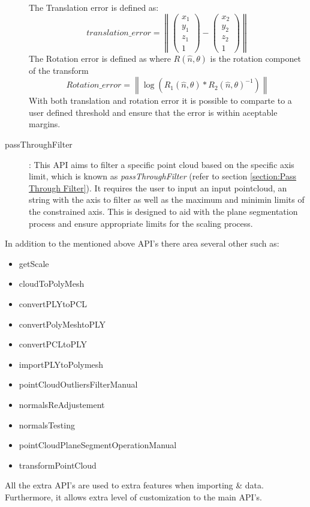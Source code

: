 \documentclass[12pt]{report}
\begin{document}
\begin{description}
   The Translation error is defined as:
   \begin{equation}
     translation\_error = \left\lVert \begin{pmatrix} x_1 \\y_1\\z_1\\1  \end{pmatrix} - \begin{pmatrix} x_2 \\y_2\\z_2\\1  \end{pmatrix} \right\rVert    
    \label{equ:translation error}
    \end{equation}
   The Rotation error is defined as where $R(\hat{n},\theta)$ is the rotation componet of the transform 
   \begin{equation}
     Rotation\_error =\left\lVert \log (R_1(\hat{n},\theta) * R_2(\hat{n},\theta)^{-1} ) \right\rVert 
   \end{equation}
 With both translation and rotation error it is possible to comparte to a user defined threshold and ensure that the error is within aceptable margins. 
  \item[passThroughFilter]: This API aims to filter a specific point cloud based on the specific axis limit, which is known as \textit{passThroughFilter} (refer to section \ref{section:Pass Through Filter}).
  It requires the user to input an input pointcloud, an string with the axis to filter as well as the maximum and minimin limits of the constrained axis. This is designed to aid with the plane segmentation process and ensure appropriate limits for the scaling process.  
\end{description}

In addition to the mentioned above API's there area several other such as:
\begin{multicols}{2}
\begin{itemize}
  \itemsep0em 
  \item getScale
  \item cloudToPolyMesh
  \item convertPLYtoPCL
  \item convertPolyMeshtoPLY
  \item convertPCLtoPLY
  \item importPLYtoPolymesh
  \item pointCloudOutliersFilterManual
  \item normalsReAdjustement
  \item normalsTesting 
  \item pointCloudPlaneSegmentOperationManual
  \item transformPointCloud
\end{itemize}
\end{multicols}
All the extra API's are used to extra features when importing \& data. Furthermore, it allows extra level of customization to the main API's.  
\end{document}

